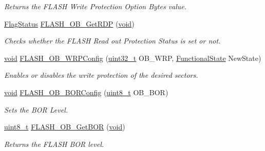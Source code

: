 \begin{DoxyCompactItemize}
\begin{DoxyCompactList}\small\item\em Returns the F\-L\-A\-S\-H Write Protection Option Bytes value. \end{DoxyCompactList}\item 
\hyperlink{group___exported__types_ga89136caac2e14c55151f527ac02daaff}{Flag\-Status} \hyperlink{group___f_l_a_s_h___group3_ga2f0151c6c923396eaf96c554a5860c31}{F\-L\-A\-S\-H\-\_\-\-O\-B\-\_\-\-Get\-R\-D\-P} (\hyperlink{group___n_a_m_e_ga18028b8badbf1ea7e704ccac3c488e82}{void})
\begin{DoxyCompactList}\small\item\em Checks whether the F\-L\-A\-S\-H Read out Protection Status is set or not. \end{DoxyCompactList}\item 
\hyperlink{group___n_a_m_e_ga18028b8badbf1ea7e704ccac3c488e82}{void} \hyperlink{group___f_l_a_s_h___group3_gaffe7e91bcce65ac079ae5afa1db568b5}{F\-L\-A\-S\-H\-\_\-\-O\-B\-\_\-\-W\-R\-P\-Config} (\hyperlink{stdint_8h_a435d1572bf3f880d55459d9805097f62}{uint32\-\_\-t} O\-B\-\_\-\-W\-R\-P, \hyperlink{group___exported__types_gac9a7e9a35d2513ec15c3b537aaa4fba1}{Functional\-State} New\-State)
\begin{DoxyCompactList}\small\item\em Enables or disables the write protection of the desired sectors. \end{DoxyCompactList}\item 
\hyperlink{group___n_a_m_e_ga18028b8badbf1ea7e704ccac3c488e82}{void} \hyperlink{group___f_l_a_s_h___group3_ga621bf052bc381c7a37fb1f8758f5ec2e}{F\-L\-A\-S\-H\-\_\-\-O\-B\-\_\-\-B\-O\-R\-Config} (\hyperlink{stdint_8h_aba7bc1797add20fe3efdf37ced1182c5}{uint8\-\_\-t} O\-B\-\_\-\-B\-O\-R)
\begin{DoxyCompactList}\small\item\em Sets the B\-O\-R Level. \end{DoxyCompactList}\item 
\hyperlink{stdint_8h_aba7bc1797add20fe3efdf37ced1182c5}{uint8\-\_\-t} \hyperlink{group___f_l_a_s_h___group3_gab8a8804905929b2edd544d28c2e7b215}{F\-L\-A\-S\-H\-\_\-\-O\-B\-\_\-\-Get\-B\-O\-R} (\hyperlink{group___n_a_m_e_ga18028b8badbf1ea7e704ccac3c488e82}{void})
\begin{DoxyCompactList}\small\item\em Returns the F\-L\-A\-S\-H B\-O\-R level. \end{DoxyCompactList}\end{DoxyCompactItemize}


